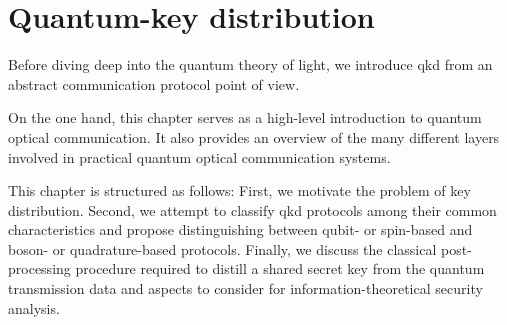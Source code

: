 \chapter{Quantum-key distribution}

Before diving deep into the quantum theory of light, we introduce \gls{qkd} from an abstract communication protocol point of view.

On the one hand, this chapter serves as a high-level introduction to quantum optical communication.
It also provides an overview of the many different layers involved in practical quantum optical communication systems.

This chapter is structured as follows:
First, we motivate the problem of key distribution.
Second, we attempt to classify \gls{qkd} protocols among their common characteristics and propose distinguishing between qubit- or spin-based and boson- or quadrature-based protocols.
Finally, we discuss the classical post-processing procedure required to distill a shared secret key from the quantum transmission data and aspects to consider for information-theoretical security analysis.
